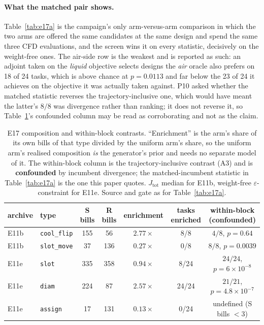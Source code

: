 \documentclass{article}
\begin{document}
\paragraph{What the matched pair shows.}
Table~\ref{tab:e17a} is the campaign's only arm-versus-arm comparison in which the two
arms are offered the same candidates at the same design and spend the same three
CFD evaluations, and the screen wins it on every statistic, decisively on the
weight-free ones.  The air-side row is the weakest and is reported as such: an
adjoint taken on the \emph{liquid} objective selects designs the \emph{air} oracle
also prefers on 18 of 24 tasks, which is above chance at $p = 0.0113$ and far below
the 23 of 24 it achieves on the objective it was actually taken against.  P10 asked
whether the matched statistic reverses the trajectory-inclusive one, which would
have meant the latter's $8/8$ was divergence rather than ranking; it does not
reverse it, so Table~\ref{tab:e17b}'s confounded column may be read as corroborating and
not as the claim.

\begin{table}[h]
\centering
\caption{E17 composition and within-block contrasts.  ``Enrichment'' is the arm's
share of its own bills of that type divided by the uniform arm's share, so the
uniform arm's realised composition \emph{is} the generator's prior and needs no
separate model of it.  The within-block column is the trajectory-inclusive contrast
(A3) and is \textbf{confounded} by incumbent divergence; the matched-incumbent
statistic in Table~\ref{tab:e17a} is the one this paper quotes.  $J_{\mathrm{tot}}$
median for E11b, weight-free $\varepsilon$-constraint for E11e.  Source and gate as
for Table~\ref{tab:e17a}.}
\label{tab:e17b}
\begin{tabular}{llcccccc}
\toprule
archive & type & S bills & R bills & enrichment & tasks enriched & \multicolumn{2}{c}{within-block (confounded)} \\
\midrule
E11b & \texttt{cool\_flip} & 155 & 56 & $2.77\times$ & 8/8 & \multicolumn{2}{c}{$4/8$, $p = 0.64$} \\
E11b & \texttt{slot\_move} & 37 & 136 & $0.27\times$ & 0/8 & \multicolumn{2}{c}{$8/8$, $p = 0.0039$} \\
E11e & \texttt{slot} & 335 & 358 & $0.94\times$ & 8/24 & \multicolumn{2}{c}{$24/24$, $p = 6\times10^{-8}$} \\
E11e & \texttt{diam} & 224 & 87 & $2.57\times$ & 24/24 & \multicolumn{2}{c}{$21/21$, $p = 4.8\times10^{-7}$} \\
E11e & \texttt{assign} & 17 & 131 & $0.13\times$ & 0/24 & \multicolumn{2}{c}{undefined (S bills $<3$)} \\
\bottomrule
\end{tabular}
\end{table}
\end{document}
